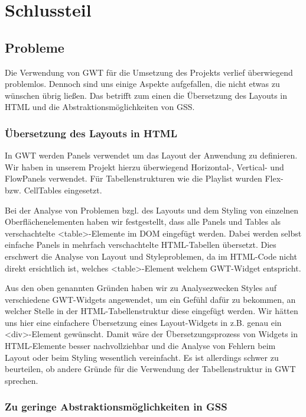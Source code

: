 \section{Schlussteil}

\subsection{Probleme}

Die Verwendung von GWT für die Umsetzung des Projekts verlief überwiegend problemlos. Dennoch sind uns einige
Aspekte aufgefallen, die nicht etwas zu wünschen übrig ließen. Das betrifft zum einen die
Übersetzung des Layouts in HTML und die Abstraktionsmöglichkeiten von GSS.

\subsubsection{Übersetzung des Layouts in HTML}

In GWT werden Panels verwendet um das Layout der Anwendung zu definieren. Wir haben in unserem Projekt
hierzu überwiegend Horizontal-, Vertical- und FlowPanels verwendet. Für Tabellenstrukturen wie die Playlist
wurden Flex- bzw. CellTables eingesetzt.

Bei der Analyse von Problemen bzgl. des Layouts und dem Styling von einzelnen Oberflächenelementen haben wir
festgestellt, dass alle Panels und Tables als verschachtelte <table>-Elemente im DOM eingefügt werden.
Dabei werden selbst einfache Panels in mehrfach verschachtelte HTML-Tabellen übersetzt. Dies erschwert
die Analyse von Layout und Styleproblemen, da im HTML-Code nicht direkt ersichtlich ist, welches
<table>-Element welchem GWT-Widget entspricht. 

Aus den oben genannten Gründen haben wir zu Analysezwecken Styles auf verschiedene GWT-Widgets angewendet,
um ein Gefühl dafür zu bekommen, an welcher Stelle in der HTML-Tabellenstruktur diese eingefügt werden.
Wir hätten uns hier eine einfachere Übersetzung eines Layout-Widgets in z.B. genau ein <div>-Element gewünscht.
Damit wäre der Übersetzungsprozess von Widgets in HTML-Elemente besser nachvollziehbar 
und die Analyse von Fehlern beim Layout oder beim Styling wesentlich vereinfacht.
Es ist allerdings schwer zu beurteilen, ob andere Gründe für die Verwendung der Tabellenstruktur in GWT sprechen.
 
\subsubsection{Zu geringe Abstraktionsmöglichkeiten in GSS}

